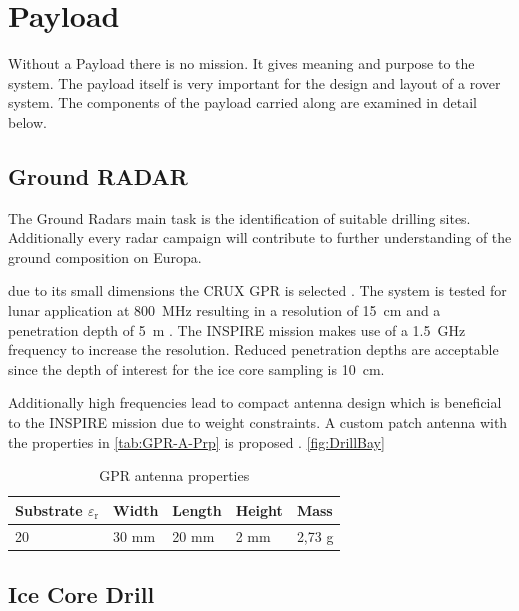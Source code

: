 
\chapter{Payload}
\label{chap:payload}

Without a Payload there is no mission. It gives meaning and purpose to the system. The payload itself is very important for the design and layout of a rover system. The components of the payload carried along are examined in detail below. 

\section{Ground RADAR}
The Ground Radars main task is the identification of suitable drilling sites. Additionally every radar campaign will contribute to further understanding of the ground composition on Europa.

due to its small dimensions the CRUX GPR is selected . The system is tested for lunar application at 800~MHz resulting in a resolution of 15~cm and a penetration depth of 5~m \cite{CRUX_GPR}. The INSPIRE mission makes use of a 1.5~GHz frequency to increase the resolution. 
Reduced penetration depths are acceptable since the depth of interest for the ice core sampling is 10~cm.

Additionally high frequencies lead to compact antenna design which is beneficial to the INSPIRE mission due to weight constraints. 
A custom patch antenna with the properties in \autoref{tab:GPR-A-Prp} is proposed \cite{patch_ant_GPR}\cite{Patch_Ant_design}. \autoref{fig:DrillBay}

\begin{table}[h]
\centering
\begin{tabular}{lllll}
\toprule
Substrate ${\varepsilon}_\text{r}$ & Width & Length & Height & Mass   \\
\midrule
20                         & 30 mm & 20 mm  & 2 mm   & 2,73 g  \\
\bottomrule
\end{tabular}
\caption{GPR antenna properties \cite{Patch_Ant_design}}
\label{tab:GPR-A-Prp}
\end{table}

\section{Ice Core Drill}


